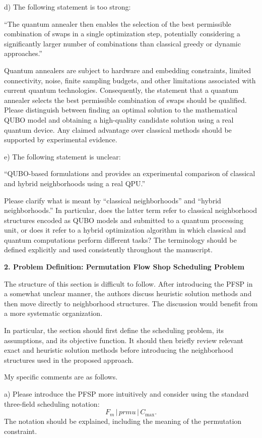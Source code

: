 \documentclass[12pt]{article}
\newcommand{\Cmax}{C_{\max}}
\begin{document}
d) The following statement is too strong:

``The quantum annealer then enables the selection of the best permissible combination of swaps in a single optimization step, potentially considering a significantly larger number of combinations than classical greedy or dynamic approaches.''

Quantum annealers are subject to hardware and embedding constraints, limited connectivity, noise, finite sampling budgets, and other limitations associated with current quantum technologies. Consequently, the statement that a quantum annealer selects the best permissible combination of swaps should be qualified. Please distinguish between finding an optimal solution to the mathematical QUBO model and obtaining a high-quality candidate solution using a real quantum device. Any claimed advantage over classical methods should be supported by experimental evidence.

e) The following statement is unclear:

``QUBO-based formulations and provides an experimental comparison of classical and hybrid neighborhoods using a real QPU.''

Please clarify what is meant by ``classical neighborhoods'' and ``hybrid neighborhoods.'' In particular, does the latter term refer to classical neighborhood structures encoded as QUBO models and submitted to a quantum processing unit, or does it refer to a hybrid optimization algorithm in which classical and quantum computations perform different tasks? The terminology should be defined explicitly and used consistently throughout the manuscript.

\textbf{2. Problem Definition: Permutation Flow Shop Scheduling Problem}

The structure of this section is difficult to follow. After introducing the PFSP in a somewhat unclear manner, the authors discuss heuristic solution methods and then move directly to neighborhood structures. The discussion would benefit from a more systematic organization.

In particular, the section should first define the scheduling problem, its assumptions, and its objective function. It should then briefly review relevant exact and heuristic solution methods before introducing the neighborhood structures used in the proposed approach.

My specific comments are as follows.

a) Please introduce the PFSP more intuitively and consider using the standard three-field scheduling notation:
\[ F_m \,|\, prmu \,|\, \Cmax . \]
The notation should be explained, including the meaning of the permutation constraint.
\end{document}
